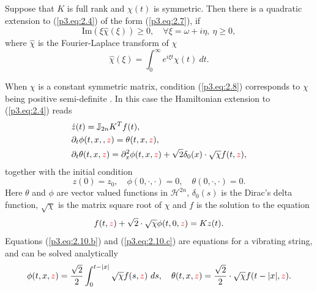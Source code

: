 \begin{theorem} \cite{figotin2007hamiltonian}
Suppose that $K$ is full rank and $\chi(t)$ is symmetric. Then there is a quadratic extension to (\ref{p3.eq:2.4}) of the form (\ref{p3.eq:2.7}), if
\begin{equation} \label{p3.eq:2.8}
	\text{Im}(\xi\hat{\chi}(\xi)) \geq 0, \quad \forall \xi = \omega + i\eta, \ \eta \geq 0,
\end{equation}
where $\hat{\chi}$ is the Fourier-Laplace transform of $\chi$
\begin{equation} \label{p3.eq:2.9}
	\hat{\chi}(\xi) = \int_0^\infty e^{i\xi t} \chi(t)\ dt.
\end{equation}
\end{theorem}
When $\chi$ is a constant symmetric matrix, condition (\ref{p3.eq:2.8}) corresponds to $\chi$ being positive semi-definite \cite{figotin2007hamiltonian}. In this case the Hamiltonian extension to (\ref{p3.eq:2.4}) reads
\begin{subequations}
\begin{align}
		\label{p3.eq:2.10.a} & \dot{z}(t) = \mathbb J_{2n} K^T f(t), \\
		\label{p3.eq:2.10.b} & \partial_t \phi(t,x,,{\color{red} z}) = \theta(t,x,{\color{red} z}), \\
		\label{p3.eq:2.10.c} & \partial_t \theta(t,x,{\color{red} z}) = \partial_x^2 \phi(t,x,{\color{red} z}) + \sqrt 2 \delta_0(x) \cdot \sqrt{\chi}  f(t,{\color{red} z}), 
\end{align}
\end{subequations}
together with the initial condition
\begin{equation} \label{p3.eq:2.10.1}
	z(0) = z_0,\quad \phi(0,\cdot,\cdot) = 0, \quad \theta(0,\cdot,\cdot) = 0.
\end{equation}
Here $\theta$ and $\phi$ are vector valued functions in $\mathcal H^{2n}$, $\delta_0(s)$ is the Dirac's delta function, $\sqrt{ \chi}$ is the matrix square root of $\chi$ and $f$ is the solution to the equation
\begin{equation} \label{p3.eq:2.11}
	f(t,{\color{red} z}) + \sqrt{2} \cdot \sqrt{ \chi } \phi(t,0,{\color{red} z}) = Kz(t).
\end{equation}
Equations (\ref{p3.eq:2.10.b}) and (\ref{p3.eq:2.10.c}) are equations for a vibrating string, and can be solved analytically
\begin{equation} \label{p3.eq:2.12}
	\phi(t,x,{\color{red} z}) = \frac {\sqrt 2} 2 \int_0^{t-|x|} \sqrt{\chi} f(s,{\color{red} z})\ ds,\quad \theta(t,x,{\color{red} z}) = \frac{\sqrt 2}{2} \cdot \sqrt{\chi} f(t - |x|,{\color{red} z}).
\end{equation}
